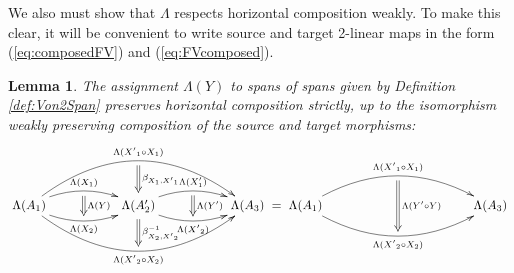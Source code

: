 \documentclass[10pt]{amsart}
\numberwithin{theorem}{subsection}
\newtheorem{lemma}[theorem]{Lemma}
\newcommand{\FV}{\Lambda}
\begin{document}
We also must show that $\FV$ respects horizontal composition weakly.  To make this clear, it will be convenient to write source and target 2-linear maps in the form (\ref{eq:composedFV}) and (\ref{eq:FVcomposed}).

\begin{lemma}\label{thm:horizcompos}The assignment $\FV(Y)$ to spans of spans given by
Definition \ref{def:Von2Span} preserves horizontal composition strictly, up to
the isomorphism weakly preserving composition of the source and target
morphisms:
\begin{equation}\label{eq:horizcompos}
\xymatrix{
\FV(A_1) \ar@/^3pc/[rrrr]^{\FV({X'}_1 \circ X_1)}="a" \ar@{}[rrrr]^{}="c" \ar@/_3pc/[rrrr]_{\FV({X'}_2 \circ X_2)}="b" \ar@/^1pc/[rr]^{\FV(X_1)}="1" \ar@/_1pc/[rr]_{\FV(X_2)}="2"  & & \FV(A_2') \ar@/^1pc/[rr]^{\FV(X'_1)}="3" \ar@/_1pc/[rr]_{\FV({X'}_2)}="4" & & \FV(A_3) \\
 {\ar@{=>}"1"+<0ex,-2.5ex> ;"2"+<0ex,+2.5ex>^{\FV(Y)}}
 {\ar@{=>}"3"+<0ex,-2.5ex> ;"4"+<0ex,+2.5ex>^{\FV(Y')}}
 {\ar@{=>}"a"+<0ex,-2.5ex> ;"c"+<0ex,+2.5ex>^{\beta_{X_1,{X'}_1}}}
 {\ar@{=>}"c"+<0ex,-2.5ex> ;"b"+<0ex,+2.5ex>^{\beta_{X_2,{X'}_2}^{-1}}}
}
=
\xymatrix{
\FV(A_1) \ar@/^2pc/[rrrr]^{\FV({X'}_1 \circ X_1)}="1" \ar@/_2pc/[rrrr]_{\FV({X'}_2 \circ X_2)}="2" & & & & \FV(A_3) \\
 {\ar@{=>}"1"+<0ex,-2.5ex> ;"2"+<0ex,+2.5ex>^{\FV(Y' \circ Y)}}
}
\end{equation}
\end{lemma}
\end{document}

